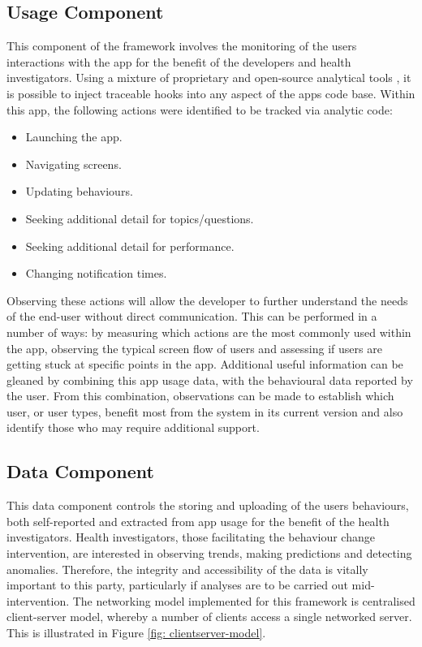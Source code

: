 \subsection{Usage Component}
This component of the framework involves the monitoring of the users interactions with the app for the benefit of the developers and health investigators.
Using a mixture of proprietary and open-source analytical tools \cite{Hartin2014-IWAAL,GoogleAnalyticsWeb,MixpanelAnalytics}, it is possible to inject traceable hooks into any aspect of the apps code base. Within this app, the following actions were identified to be tracked via analytic code:
\begin{itemize}[noitemsep,topsep=0pt]
\item Launching the app.
\item Navigating screens.
\item Updating behaviours.
\item Seeking additional detail for topics/questions.
\item Seeking additional detail for performance.
\item Changing notification times.
\end{itemize}

Observing these actions will allow the developer to further understand the needs of the end-user without direct communication. This can be performed in a number of ways: by measuring which actions are the most commonly used within the app, observing the typical screen flow of users and assessing if users are getting stuck at specific points in the app.
Additional useful information can be gleaned by combining this app usage data, with the behavioural data reported by the user. From this combination, observations can be made to establish which user, or user types, benefit most from the system in its current version and also identify those who may require additional support.

\subsection{Data Component}
This data component controls the storing and uploading of the users behaviours, both self-reported and extracted from app usage for the benefit of the health investigators. Health investigators, those facilitating the behaviour change intervention, are interested in observing trends, making predictions and detecting anomalies. Therefore, the integrity and accessibility of the data is vitally important to this party, particularly if analyses are to be carried out mid-intervention. The networking model implemented for this framework is centralised client-server model, whereby a number of clients access a single networked server. This is illustrated in Figure \ref{fig: clientserver-model}.

